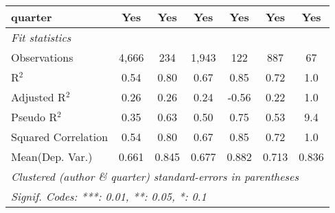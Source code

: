 \begin{tabular}{lcccccc}
   quarter                                                    & Yes            & Yes        & Yes           & Yes          & Yes            & Yes\\  
   \midrule
   \emph{Fit statistics}\\
   Observations                                               & 4,666          & 234        & 1,943         & 122          & 887            & 67\\  
   R$^2$                                                      & 0.54           & 0.80       & 0.67          & 0.85         & 0.72           & 1.0\\  
   Adjusted R$^2$                                             & 0.26           & 0.26       & 0.24          & -0.56        & 0.22           & 1.0\\  
   Pseudo R$^2$                                               & 0.35           & 0.63       & 0.50          & 0.75         & 0.53           & 9.4\\  
   Squared Correlation                                        & 0.54           & 0.80       & 0.67          & 0.85         & 0.72           & 1.0\\  
Mean(Dep. Var.) & 0.661 & 0.845 & 0.677 & 0.882 & 0.713 & 0.836 \\
   \midrule \midrule
   \multicolumn{7}{l}{\emph{Clustered (author \& quarter) standard-errors in parentheses}}\\
   \multicolumn{7}{l}{\emph{Signif. Codes: ***: 0.01, **: 0.05, *: 0.1}}\\
\end{tabular}
\par\endgroup

